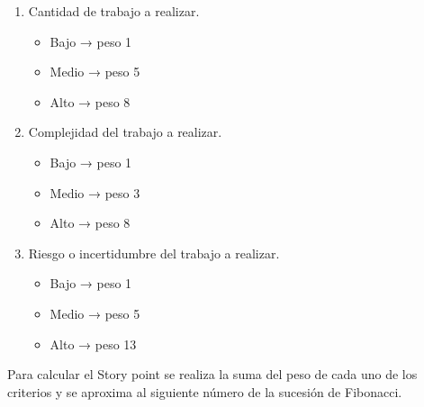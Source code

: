 \documentclass[
11pt, %
codirector, %
]{charter}
\begin{document}
\begin{enumerate}

\item Cantidad de trabajo a realizar.
\begin{itemize}
       \item Bajo → peso 1
       \item Medio → peso 5
       \item Alto → peso 8
       \end{itemize}
\item Complejidad del trabajo a realizar.
\begin{itemize}
       \item Bajo → peso 1
       \item Medio → peso 3
       \item Alto → peso 8
       \end{itemize}
\item Riesgo o incertidumbre del trabajo a realizar.
\begin{itemize}
       \item Bajo → peso 1
       \item Medio → peso 5
       \item Alto → peso 13
       \end{itemize}
\end{enumerate}


Para calcular el Story point se realiza la suma del peso de cada uno de los criterios y se aproxima al siguiente número de la sucesión de Fibonacci.
\end{document}
